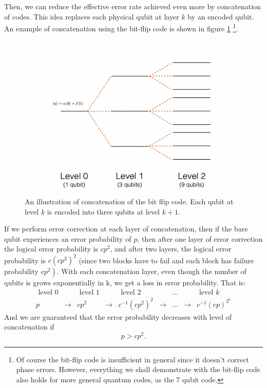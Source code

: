 Then, we can reduce the effective error rate achieved even more by concatenation of codes. 
This idea replaces each physical qubit at layer $k$ by an encoded qubit. An example of concatenation using the bit-flip code is shown in figure \ref{fig:codeconc} \footnote{Of course the bit-flip code is insufficient in general since it doesn’t correct phase errors. However, everything we shall demonstrate with the bit-flip code also holds for more general quantum codes, as the 7 qubit code.}.
\begin{figure}[h!]
    \centering
    \includegraphics[scale=0.5]{Mainmatter/images/concatenation.png}
    \caption{An illustration of concatenation of the bit flip code. Each qubit at level $k$ is encoded into three qubits at level $k + 1$.}
    \label{fig:codeconc}
\end{figure}

If we perform error correction at each layer of concatenation, then if the bare qubit experiences an error probability of $p$, then after one layer of error correction the logical error probability is $c p^{2}$, and after two layers, the logical error probability is $c\left(c p^{2}\right)^{2}$ (since two blocks have to fail and each block has failure probability $\left.c p^{2}\right)$. With each concatenation layer, even though the number of qubits is grows exponentially in k, we get a loss in error probability. That is:
$$
\begin{array}{cccccccccc}
\text { level } 0 & & \text { level } 1 & & \text { level } 2 & & \ldots  & & \text { level } k\\
p &\rightarrow & c p^{2} &\rightarrow & c^{-1}\left(c p^{2}\right)^{2} &\rightarrow& \ldots &\rightarrow& c^{-1}(c p)^{2^{k}}
\end{array}
$$
And we are guaranteed that the error probability decreases with level of concatenation if
\begin{equation}
p > c p^2.
\label{eq:plesscpp}
\end{equation}

